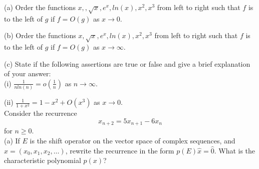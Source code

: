 \documentclass[12pt]{article}
\begin{document}
\studentinfo
{}
\finishfirstpage

\newpage


\noindent 
(a) Order the functions $x, , \sqrt{x}, e^x, ln(x), x^2, x^3$ from left to right such that $f$ is to the left of $g$ if $f=O(g)$ as $x \to 0$. \\

\vspace{1 in}

\noindent
(b) Order the functions $x, \sqrt{x}, e^x, ln(x), x^2, x^3$ from left to right such that $f$ is to the left of $g$ if $f=O(g)$ as $x \to \infty$. \\

\vspace{1 in}

\noindent
(c) State if the following assertions are true or false and give a brief explanation of your answer: \\
\noindent
(i) $\frac{1}{n ln(n)}=o(\frac{1}{n})$ as $n \to \infty$. \\

\vspace{1in}

\noindent
(ii) $\frac{1}{1+x^2} = 1- x^2+  O(x^3)$ as $x \to 0$. \\


 
    
\newpage
{}
Consider the recurrence 
$$
x_{n+2}=5x_{n+1}-6x_n
$$
for $n \geq 0$. \\

\noindent
(a) If $E$ is the shift operator on the vector space of complex sequences, and $\hat{x}=(x_0,x_1,x_2,\dots)$, rewrite the recurrence in the form 
$p(E)\hat{x}=\hat{0}$. What is the characteristic polynomial $p(x)$? 

\vspace{2 in}
\end{document}
